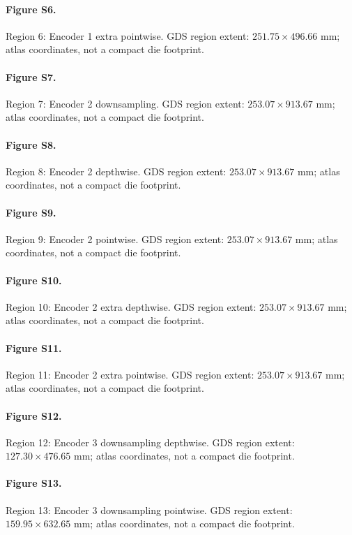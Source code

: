 \paragraph{Figure S6.} Region 6: Encoder 1 extra pointwise. GDS region extent: $251.75\times496.66$ mm; atlas coordinates, not a compact die footprint.

\paragraph{Figure S7.} Region 7: Encoder 2 downsampling. GDS region extent: $253.07\times913.67$ mm; atlas coordinates, not a compact die footprint.

\paragraph{Figure S8.} Region 8: Encoder 2 depthwise. GDS region extent: $253.07\times913.67$ mm; atlas coordinates, not a compact die footprint.

\paragraph{Figure S9.} Region 9: Encoder 2 pointwise. GDS region extent: $253.07\times913.67$ mm; atlas coordinates, not a compact die footprint.

\paragraph{Figure S10.} Region 10: Encoder 2 extra depthwise. GDS region extent: $253.07\times913.67$ mm; atlas coordinates, not a compact die footprint.

\paragraph{Figure S11.} Region 11: Encoder 2 extra pointwise. GDS region extent: $253.07\times913.67$ mm; atlas coordinates, not a compact die footprint.

\paragraph{Figure S12.} Region 12: Encoder 3 downsampling depthwise. GDS region extent: $127.30\times476.65$ mm; atlas coordinates, not a compact die footprint.

\paragraph{Figure S13.} Region 13: Encoder 3 downsampling pointwise. GDS region extent: $159.95\times632.65$ mm; atlas coordinates, not a compact die footprint.

